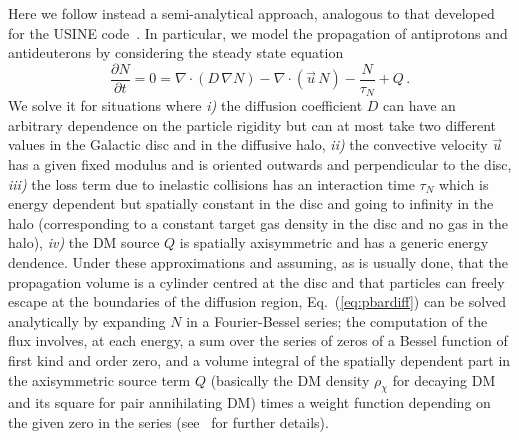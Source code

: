 \documentclass[a4paper,10pt,oneside]{book}
\begin{document}
Here we follow instead a semi-analytical approach, analogous to that developed for the USINE 
code~\cite{Maurin:2001sj}. In particular, we model
the propagation of antiprotons and antideuterons by considering the steady state equation~\cite{Bergstrom:1999jc}
\begin{equation}
 \frac{\partial{N}}{\partial{t}} = 0 = \nabla \cdot
 \left(D\,\nabla N\right)
 - \nabla \cdot \left( \vec{u}\,N \right)
 - \frac{N}{\tau_N} + Q\,.
\label{eq:pbardiff}
\end{equation}
We solve it for situations where {\it i)} the diffusion coefficient $D$ can have an arbitrary dependence on the particle 
rigidity but can at most take two different values in the Galactic disc and in the diffusive halo, {\it ii)} the 
convective velocity $\vec{u}$ has a given fixed modulus and is oriented outwards and perpendicular to the disc,
{\it iii)} the loss term due to inelastic collisions has an interaction time $\tau_N$ which is energy dependent 
but spatially constant in the disc and going to infinity in the halo (corresponding to a constant target gas 
density in the disc and no gas in the halo), {\it iv)} the DM
source $Q$ is spatially axisymmetric and has a generic energy dendence. Under these
approximations and assuming, as is usually done, that the propagation volume is a cylinder centred at the disc 
and that particles can freely
escape at the boundaries of the diffusion region, Eq.~(\ref{eq:pbardiff}) can be solved analytically by expanding $N$
in a Fourier-Bessel series; the computation of the flux involves, at each energy, a sum over the series of 
zeros of a Bessel function of first kind and order zero, and a volume integral of the spatially dependent part in the axisymmetric
source term $Q$
 (basically the DM density $\rho_\chi$ for decaying DM and its square for pair annihilating DM) 
times a
weight function depending on the given zero in the series (see~\cite{Bergstrom:1999jc} for further details).
\end{document}

